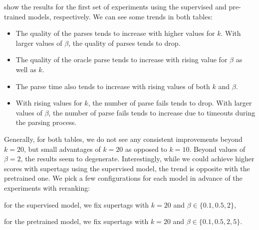 \documentclass[../../document.tex]{subfiles}
\begin{document}
     show the results for the first set of experiments using the supervised and pre-trained models, respectively.
    We can see some trends in both tables:
    \begin{itemize}
        \item The quality of the parses tends to increase with higher values for $k$.  With larger values of \(\beta\), the quality of parses tends to drop.
        \item The quality of the oracle parse tends to increase with rising value for $\beta$ as well as \(k\).
        \item The parse time also tends to increase with rising values of both \(k\) and \(\beta\).
        \item With rising values for $k$, the number of parse fails tends to drop. With larger values of \(\beta\), the number of parse fails tends to increase due to timeouts during the parsing process.
    \end{itemize}
    Generally, for both tables, we do not see any consistent improvements beyond \(k=20\), but small advantages of \(k=20\) as opposed to \(k=10\).
    Beyond values of \(\beta = 2\), the results seem to degenerate.
    Interestingly, while we could achieve higher scores with  supertags using the supervised model, the trend is opposite with the pretrained one.
    We pick a few configurations for each model in advance of the experiments with reranking:
    \begin{compactitem}
        \item for the supervised model, we fix  supertags with \(k = 20\) and \(\beta \in \{0.1,0.5,2\}\),
        \item for the pretrained model, we fix  supertags with \(k = 20\) and \(\beta \in \{0.1,0.5,2,5\}\).
    \end{compactitem}
\end{document}
